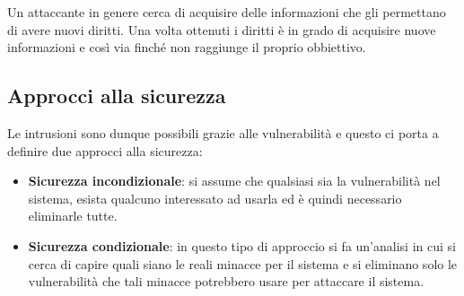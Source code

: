 Un attaccante in genere cerca di acquisire delle informazioni che gli permettano di avere nuovi diritti. Una volta
ottenuti i diritti è in grado di acquisire nuove informazioni e così via finché non raggiunge il proprio obbiettivo.

\subsection{Approcci alla sicurezza}
Le intrusioni sono dunque possibili grazie alle vulnerabilità e questo ci porta a definire due approcci alla sicurezza:
\begin{itemize}
	\item \textbf{Sicurezza incondizionale}: si assume che qualsiasi sia la vulnerabilità nel sistema, esista qualcuno
	      interessato ad usarla ed è quindi necessario eliminarle tutte.
	\item \textbf{Sicurezza condizionale}: in questo tipo di approccio si fa un'analisi in cui si cerca di capire quali
	      siano le reali minacce per il sistema e si eliminano solo le vulnerabilità che tali minacce potrebbero usare
	      per attaccare il sistema.
\end{itemize}